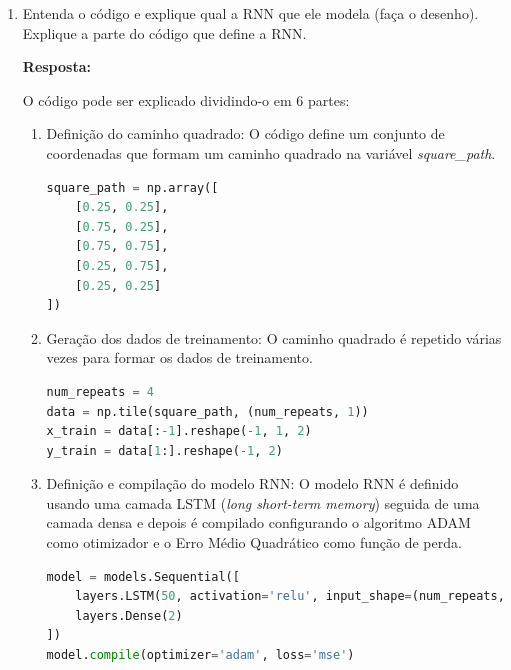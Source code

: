 \documentclass[12 pt]{article}
\begin{document}
\begin{enumerate}
    \item Entenda o código e explique qual a RNN que ele modela (faça o desenho). Explique a parte do código que define a RNN.
    
    \textbf{Resposta:} \par

    O código pode ser explicado dividindo-o em 6 partes:
    \begin{enumerate}
        \item Definição do caminho quadrado: O código define um conjunto de coordenadas que formam um caminho quadrado na variável \textit{square\_path}.
        \begin{lstlisting}[language=Python]
square_path = np.array([
    [0.25, 0.25],
    [0.75, 0.25],
    [0.75, 0.75],
    [0.25, 0.75],
    [0.25, 0.25]
])
        \end{lstlisting}
        \item Geração dos dados de treinamento: O caminho quadrado é repetido várias vezes para formar os dados de treinamento.
        \begin{lstlisting}[language=Python]
num_repeats = 4
data = np.tile(square_path, (num_repeats, 1))
x_train = data[:-1].reshape(-1, 1, 2)
y_train = data[1:].reshape(-1, 2)
        \end{lstlisting}
        \item Definição e compilação do modelo RNN: O modelo RNN é definido usando uma camada LSTM (\textit{long short-term memory}) seguida de uma camada densa e depois é compilado configurando o algoritmo ADAM como otimizador e o Erro Médio Quadrático como função de perda.
        \begin{lstlisting}[language=Python]
model = models.Sequential([
    layers.LSTM(50, activation='relu', input_shape=(num_repeats, 2)),
    layers.Dense(2)
])
model.compile(optimizer='adam', loss='mse')            
        \end{lstlisting}

        \begin{figure}[H]
            \centering
\end{figure}
\end{enumerate}
\end{enumerate}
\end{document}
